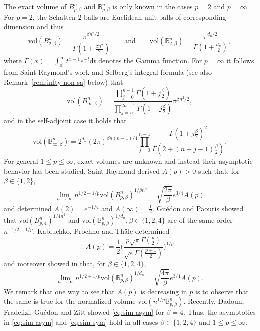 \documentclass[a4paper,12pt,reqno]{amsart}
\theoremstyle{definition}
\newcommand{\IB}{\mathbb{B}}
\newcommand{\vol}{\mathrm{vol}}
\newcommand{\dd}{\mathrm{d}}
\newcommand{\bpb}{\mathbb{B}_{p,\beta}^n}
\begin{document}
The exact volume of $B_{p,\beta}^n$ and $\bpb$ is only known in the cases $p=2$ and $p=\infty$. For $p=2$, the Schatten $2$-balls are Euclidean unit balls of corresponding dimension and thus
\begin{equation*} 
\vol(B_{2,\beta}^n)
=\frac{\pi^{\beta n^2/2}}{\Gamma(1+\frac{\beta n^2}{2})}
\qquad\text{and}\qquad
\vol(\IB_{2,\beta}^n)
=\frac{\pi^{d_n/2}}{\Gamma(1+\frac{d_n}{2})},
\end{equation*} 
where $\Gamma(x)=\int_0^{\infty}t^{x-1}e^{-t}\dd t$ denotes the Gamma function. For $p=\infty$ it follows from Saint Raymond's work \cite{SR84} and Selberg's integral formula \cite{And91,Sel44} (see also Remark~\ref{rem:infty-non-sa} below) that
\begin{equation} \label{eq:inf-exact}
\vol(B_{\infty,\beta}^n)
=\frac{\prod_{j=0}^{n-1}\Gamma( 1+j\frac{\beta}{2} )}{\prod_{j=n}^{2n-1}\Gamma( 1+j\frac{\beta}{2})}\pi^{\beta n^2/2},
\end{equation}
and in the self-adjoint case it holds that
\begin{equation} \label{eq:inf-sa-exact}
\vol(\IB_{\infty,\beta}^n)
=2^{d_n}(2\pi)^{\beta n(n-1)/4}\prod_{j=0}^{n-1}\frac{\Gamma( 1+j\frac{\beta}{2})^2}{\Gamma( 2+(n+j-1)\frac{\beta}{2} )}.
\end{equation}
For general $1\le p\le \infty$, exact volumes are unknown and instead their asymptotic behavior has been studied. Saint Raymond \cite{SR84} derived $A(p)>0$ such that, for $\beta\in\{1,2\}$, 
\begin{equation} \label{eq:sim-asym}
\lim_{n\to \infty}n^{1/2+1/p}\vol(B_{p,\beta}^n)^{1/\beta n^2}
=\sqrt{\frac{2\pi}{\beta}}e^{3/4}A(p)
\end{equation}
and determined $A(2)=e^{-1/4}$ and $A(\infty)=\frac{1}{2}$. Gu\'{e}don and Paouris \cite{GP07} showed that $\vol(B_{p,4}^n)^{1/4 n^2}$ and $\vol(\bpb)^{1/d_n}, \beta\in\{1,2,4\}$ are of the same order $n^{-1/2-1/p}$. Kabluchko, Prochno and Thäle \cite{KPT20a} determined
\begin{equation} \label{eq:delta}
A(p)
=\frac{1}{2}\bigg(\frac{p\sqrt{\pi}\Gamma(\frac{p}{2})}{\sqrt{e}\Gamma(\frac{p+1}{2})}\bigg)^{1/p}
\end{equation}
and moreover showed in \cite{KPT20b} that, for $\beta\in \{1,2,4\}$,
\begin{equation} \label{eq:sim-sym}
	\lim_{n\to \infty}n^{1/2+1/p}\vol(\bpb)^{1/d_n}
	=\sqrt{\frac{4\pi}{\beta}}e^{3/4}A(p).
\end{equation}
We remark that one way to see that $A(p)$ is decreasing in $p$ is to observe that the same is true for the normalized volume $\vol(n^{1/p}\bpb)$. Recently, Dadoun, Fradelizi, Gu\'{e}don and Zitt \cite[Remark 4.8]{DFG+23} showed \eqref{eq:sim-asym} for $\beta=4$. Thus, the asymptotics in \eqref{eq:sim-asym} and \eqref{eq:sim-sym} hold in all cases $\beta\in \{1,2,4\}$ and $1\le p\le \infty$. 
\end{document}
